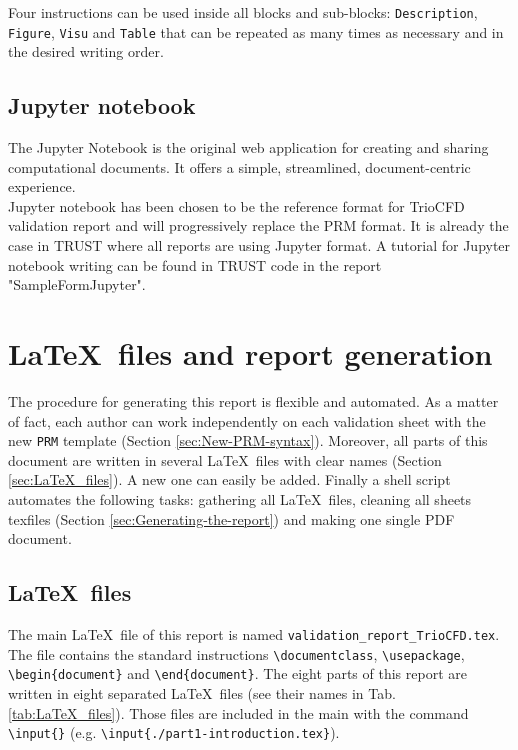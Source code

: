 Four instructions can be used inside all blocks and sub-blocks: \texttt{Description},
\texttt{Figure}, \texttt{Visu} and \texttt{Table} that can be repeated
as many times as necessary and in the desired writing order.


\section{Jupyter notebook}
\label{sec:Jupyter_notebook}

The Jupyter Notebook is the original web application for creating and sharing computational documents.
It offers a simple, streamlined, document-centric experience.\\

Jupyter notebook has been chosen to be the reference format for TrioCFD validation report
and will progressively replace the PRM format.
It is already the case in TRUST where all reports are using Jupyter format.
A tutorial for Jupyter notebook writing can be found in TRUST code in the report "SampleFormJupyter".


\chapter{\label{chap:Validation-report-generation}\LaTeX~files and report generation}
The procedure for generating this report is flexible and automated.
As a matter of fact, each author can work independently on each validation
sheet with the new \texttt{PRM} template (Section \ref{sec:New-PRM-syntax}).
Moreover, all parts of this document are written in several \LaTeX~files
with clear names (Section \ref{sec:LaTeX_files}). A new one can
easily be added. Finally a shell script automates the following tasks:
gathering all \LaTeX~files, cleaning all sheets texfiles (Section
\ref{sec:Generating-the-report}) and making one single PDF document.
\section{\label{sec:LaTeX_files}\LaTeX~files}
The main \LaTeX~file of this report is named \texttt{validation\_report\_TrioCFD.tex}.
The file contains the standard instructions \texttt{\textbackslash{}documentclass},
\texttt{\textbackslash{}usepackage},\texttt{ \textbackslash{}begin\{document\}}
and \texttt{\textbackslash{}end\{document\}}. The eight parts of this
report are written in eight separated \LaTeX~files (see their names
in Tab. \ref{tab:LaTeX_files}). Those files are included in the main
with the command \texttt{\textbackslash{}input\{\}} (e.g. \texttt{\textbackslash{}input\{./part1-introduction.tex\}}).

